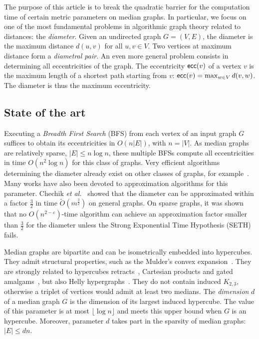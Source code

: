 \documentclass[a4paper,UKenglish,numberwithinsect,cleveref, autoref]{lipics-v2021}
\newcommand{\card}[1]{\left| #1 \right|}
\newcommand{\ecc}{\mbox{\textsf{ecc}}}
\begin{document}
The purpose of this article is to break the quadratic barrier for the computation time of certain metric parameters on median graphs. In particular, we focus on one of the most fundamental problems in algorithmic graph theory related to distances: the \textit{diameter}. Given an undirected graph $G=(V,E)$, the diameter is the maximum distance $d(u,v)$ for all $u,v \in V$. Two vertices at maximum distance form a \textit{diametral pair}. An even more general problem consists in determining all eccentricities of the graph. The eccentricity $\ecc(v)$ of a vertex $v$ is the maximum length of a shortest path starting from $v$: $\ecc(v) = \max_{w \in V} d(v,w)$. The diameter is thus the maximum eccentricity.

\subsection{State of the art}

Executing a \textit{Breadth First Search} (BFS) from each vertex of an input graph $G$ suffices to obtain its eccentricities in $O(n\card{E})$, with $n = \card{V}$. As median graphs are relatively sparse, $\card{E} \le n\log n$, these multiple BFSs compute all eccentricities in time $O(n^2\log n)$ for this class of graphs.
Very efficient algorithms determining the diameter already exist on other classes of graphs, for example~\cite{AbWiWa16,Ca17,DuHaVi20}. Many works have also been devoted to approximation algorithms for this parameter. Chechik {\em et al.}~\cite{ChLaRoScTaWi14} showed that the diameter can be approximated within a factor $\frac{3}{2}$ in time $\tilde{O}(m^{\frac{3}{2}})$ on general graphs. On sparse graphs, it was shown~\cite{RoWi13} that no $O(n^{2-\varepsilon})$-time algorithm can achieve an approximation factor smaller than $\frac{3}{2}$ for the diameter unless the Strong Exponential Time Hypothesis (SETH) fails.

Median graphs are bipartite and can be isometrically embedded into hypercubes. They admit structural properties, such as the Mulder's convex expansion~\cite{Mu78,Mu80}. They are strongly related to hypercubes retracts~\cite{Ba84}, Cartesian products and gated amalgams~\cite{BaCh08}, but also Helly hypergraphs~\cite{MuSc79}. They do not contain induced $K_{2,3}$, otherwise a triplet of vertices would admit at least two medians. The \textit{dimension} $d$ of a median graph $G$ is the dimension of its largest induced hypercube. The value of this parameter is at most $\lfloor \log n \rfloor$ and meets this upper bound when $G$ is an hypercube. Moreover, parameter $d$ takes part in the sparsity of median graphs: $\card{E} \le dn$.
\end{document}
